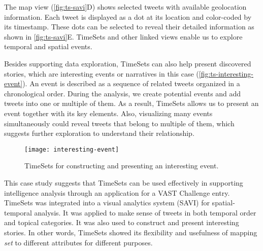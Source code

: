 The map view (\autoref{fig:ts-savi}D) shows selected tweets with available geolocation information. Each tweet is displayed as a dot at its location and color-coded by its timestamp. These dots can be selected to reveal their detailed information as shown in \autoref{fig:ts-savi}E. TimeSets and other linked views enable us to explore temporal and spatial events.

Besides supporting data exploration, TimeSets can also help present discovered stories, which are interesting events or narratives in this case (\autoref{fig:ts-interesting-event}). An event is described as a sequence of related tweets organized in a chronological order. During the analysis, we create potential events and add tweets into one or multiple of them. As a result, TimeSets allows us to present an event together with its key elements. Also, visualizing many events simultaneously could reveal tweets that belong to multiple of them, which suggests further exploration to understand their relationship.

\begin{figure}
	\centering
	\texttt{[image: interesting-event]}
	\caption{TimeSets for constructing and presenting an interesting event.}
	\label{fig:ts-interesting-event}
\end{figure}

This case study suggests that TimeSets can be used effectively in supporting intelligence analysis through an application for a VAST Challenge entry. TimeSets was integrated into a visual analytics system (SAVI) for spatial-temporal analysis. It was applied to make sense of tweets in both temporal order and topical categories. It was also used to construct and present interesting stories. In other words, TimeSets showed its flexibility and usefulness of  mapping \emph{set} to different attributes for different purposes.
